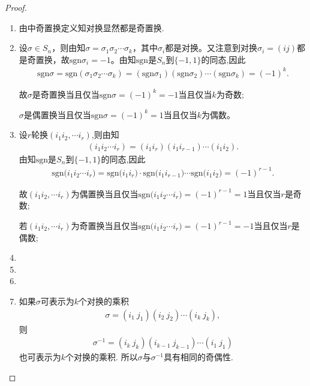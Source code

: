 \documentclass[../../main.tex]{subfiles}%
\begin{document}
\begin{proof}
\begin{enumerate}[(1)]
\item 由中奇置换定义知对换显然都是奇置换.

\item 设$\sigma \in S_n$，则由知$\sigma = \sigma_1\sigma_2\cdots\sigma_k$，其中$\sigma_i$都是对换。又注意到对换$\sigma_i = (ij)$都是奇置换，故$\text{sgn} \sigma_i = -1$。由知$\text{sgn}$是$S_n$到$\{-1,1\}$的同态,因此
\begin{align*}
\text{sgn} \sigma = \text{sgn}(\sigma_1\sigma_2\cdots\sigma_k) = (\text{sgn} \sigma_1)(\text{sgn} \sigma_2)\cdots(\text{sgn} \sigma_k) = (-1)^k.
\end{align*}

故$\sigma$是奇置换当且仅当$\text{sgn} \sigma = (-1)^k = -1$当且仅当$k$为奇数;

$\sigma$是偶置换当且仅当$\text{sgn} \sigma = (-1)^k = 1$当且仅当$k$为偶数。

\item 设$r$轮换$(i_1i_2,\cdots i_r)$,则由知
\begin{align*}
(i_1i_2\cdots i_r)=(i_1i_r)(i_1i_{r-1})\cdots (i_1i_2).
\end{align*}
由知$\text{sgn}$是$S_n$到$\{-1,1\}$的同态,因此
\begin{align*}
\text{sgn}\mathrm{(}i_1i_2\cdots i_r)=\text{sgn}\mathrm{(}i_1i_r)\cdot \text{sgn}\mathrm{(}i_1i_{r-1})\cdots \text{sgn}\mathrm{(}i_1i_2)=\left( -1 \right) ^{r-1}.
\end{align*}

故$(i_1i_2,\cdots i_r)$为偶置换当且仅当$\text{sgn}\mathrm{(}i_1i_2\cdots i_r) = (-1)^{r-1} = 1$当且仅当$r$是奇数;

若$(i_1i_2,\cdots i_r)$为奇置换当且仅当$\text{sgn}\mathrm{(}i_1i_2\cdots i_r) = (-1)^{r-1} = -1$当且仅当$r$是偶数;

\item 

\item 

\item 

\item 如果$\sigma$可表示为$k$个对换的乘积
\begin{align*}
\sigma = (i_1\ j_1)(i_2\ j_2)\cdots(i_k\ j_k),
\end{align*}
则
\begin{align*}
\sigma^{-1} = (i_k\ j_k)(i_{k-1}\ j_{k-1})\cdots(i_1\ j_1)
\end{align*}
也可表示为$k$个对换的乘积. 所以$\sigma$与$\sigma^{-1}$具有相同的奇偶性.
\end{enumerate}

\end{proof}
\end{document}
